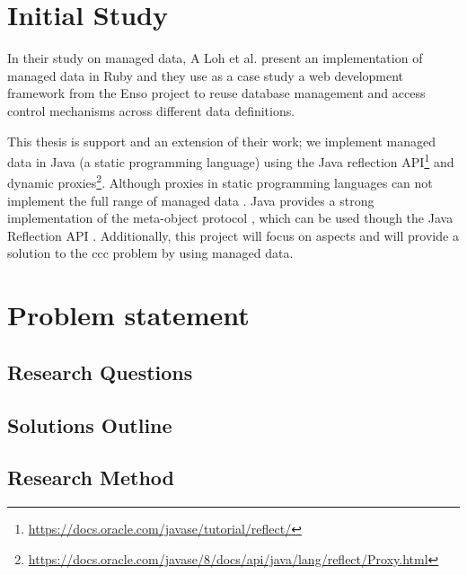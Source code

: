 \section{Initial Study}\label{Initial Study}
In their study on managed data, A Loh et al. \cite{loh2012managed} present an implementation of managed data
in Ruby and they use as a case study a web development framework from the Enso project to reuse database management and 
access control mechanisms across different data definitions.


This thesis is support and an extension of their work; we implement managed data in Java (a static programming language) using the Java reflection API\footnote{\url{https://docs.oracle.com/javase/tutorial/reflect/}} and dynamic proxies\footnote{\url{https://docs.oracle.com/javase/8/docs/api/java/lang/reflect/Proxy.html}}. 
Although proxies in static programming languages can not implement the full range of managed data \cite{loh2012managed}. 
Java provides a strong implementation of the meta-object protocol \cite{kiczales1991art}, which can be used though the Java Reflection API \cite{forman2004java}. 
Additionally, this project will focus on aspects and will provide a solution to the \ac{ccc} problem by using managed data.

\section{Problem statement}\label{Problem statement}

\subsection{Research Questions}\label{Research Questions}

\subsection{Solutions Outline}\label{Solutions Outline}

\subsection{Research Method}\label{Research Method}

